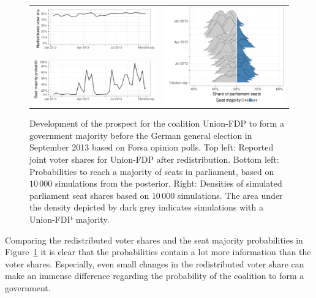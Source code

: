 \documentclass[smallcondensed]{svjour3}     %
\begin{document}
\begin{figure}[H]\centering
\begin{tabular}{ll}
\includegraphics[height=.15\textwidth]{figures/2013_forsa_cdufdp_rawSharesRedist.pdf}
&
\multirow{2}{*}[13ex]{\includegraphics[height=30ex]{figures/2013_forsa_cdufdp_ridgeline.pdf}}
\\
\includegraphics[height=.15\textwidth]{figures/2013_forsa_cdufdp_prob.pdf}
\end{tabular}
\caption{Development of the prospect for the coalition Union-FDP to form a
government majority before the German general election in September 2013 based on
Forsa opinion polls.
Top left: Reported joint voter shares for Union-FDP after redistribution.
Bottom left: Probabilities to reach a majority of seats in parliament, based on
$10\,000$ simulations from the posterior.
Right: Densities of simulated parliament seat shares based on $10\,000$ simulations.
The area under the density depicted by dark grey indicates simulations with a
Union-FDP majority.
\label{fig:seatDist_time}
}
\end{figure}

Comparing the redistributed voter shares and the seat majority probabilities
in Figure~\ref{fig:seatDist_time} it is clear that the probabilities contain
a lot more information than the voter shares. Especially, even small changes
in the redistributed voter share can make an immense difference regarding the
probability of the coalition to form a government.\\
\end{document}
